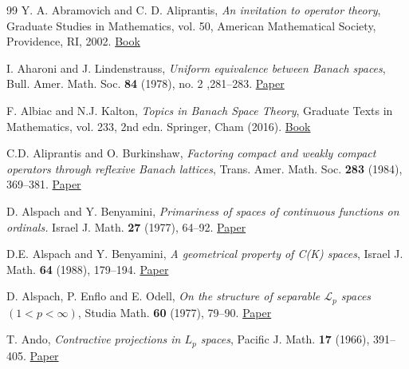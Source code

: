 \documentclass[11pt]{amsart}
\theoremstyle{definition}
\numberwithin{equation}{section}
\begin{document}
\begin{thebibliography}{99}
 Y. A. Abramovich and C. D. Aliprantis, \emph{An invitation to operator theory}, Graduate Studies in Mathematics, vol. 50, American Mathematical Society, Providence, RI, 2002. \href{https://doi.org/10.1090/gsm/050}{Book}

I. Aharoni and J. Lindenstrauss, \emph{Uniform equivalence between Banach spaces}, Bull. Amer. Math. Soc. \textbf{84} (1978), no. 2 ,281--283. \href{https://doi.org/10.1090/S0002-9904-1978-14475-9}{Paper}




F. Albiac and N.J. Kalton, \textit{Topics in Banach Space Theory}, Graduate Texts in Mathematics, vol. 233, 2nd edn. Springer, Cham (2016). \href{https://link.springer.com/book/10.1007/978-3-319-31557-7}{Book}



C.D. Aliprantis and O. Burkinshaw, \textit{Factoring compact and weakly compact operators through reflexive Banach lattices}, Trans. Amer. Math. Soc. \textbf{283} (1984), 369--381.
\href{https://www.ams.org/journals/tran/1984-283-01/S0002-9947-1984-0735429-0/}{Paper}




D. Alspach and Y. Benyamini, \emph{Primariness of spaces of continuous functions on ordinals.} Israel J. Math. \textbf{27} (1977), 64--92. \href{https://doi.org/10.1007/BF02761606}{Paper}



D.E. Alspach and Y. Benyamini, \textit{A geometrical property of C(K) spaces}, Israel J. Math. \textbf{64} (1988), 179--194. \href{https://link.springer.com/article/10.1007/BF02787222}{Paper}


D. Alspach, P. Enflo and E. Odell, \emph{On the structure of separable $\mathscr{L}_p$ spaces $(1<p<\infty)$}, Studia Math. \textbf{60} (1977), 79--90.
\href{https://old.impan.pl/en/publishing-house/journals-and-series/studia-mathematica/all/60/1/101700/on-the-structure-of-separable-l-p-spaces-1-p}{Paper}


T. Ando, \emph{Contractive projections in $L_p$ spaces}, Pacific J. Math. \textbf{17} (1966), 391--405. \href{https://projecteuclid.org/journals/pacific-journal-of-mathematics/volume-17/issue-3/Contractive-projections-in-L_p-spaces/pjm/1102994507.full}{Paper}




\end{thebibliography}
\end{document}
